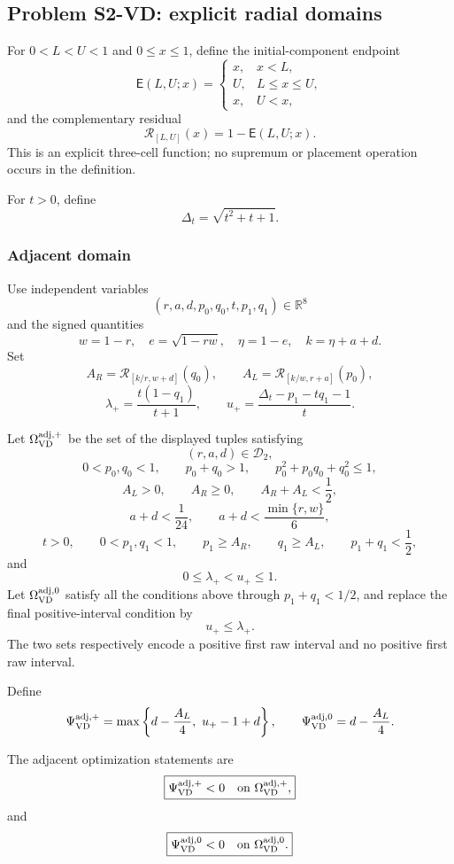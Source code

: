 \subsection{Problem S2-VD: explicit radial domains}

For \(0<L<U<1\) and \(0\le x\le1\), define the initial-component endpoint
\[
 \mathsf E(L,U;x)=
 \begin{cases}
 x,&x<L,\\
 U,&L\le x\le U,\\
 x,&U<x,
 \end{cases}
\]
and the complementary residual
\[
 \mathcal R_{[L,U]}(x)=1-\mathsf E(L,U;x).
\]
This is an explicit three-cell function; no supremum or placement operation
occurs in the definition.

For \(t>0\), define
\[
 \Delta_t=\sqrt{t^2+t+1}.
\]

\subsubsection{Adjacent domain}

Use independent variables
\[
 (r,a,d,p_0,q_0,t,p_1,q_1)\in\mathbb R^8
\]
and the signed quantities
\[
 w=1-r,\quad e=\sqrt{1-rw},\quad
 \eta=1-e,\quad k=\eta+a+d.
\]
Set
\[
 A_R=\mathcal R_{[k/r,w+d]}(q_0),
 \qquad
 A_L=\mathcal R_{[k/w,r+a]}(p_0),
\]
\[
 \lambda_+=\frac{t(1-q_1)}{t+1},
 \qquad
 u_+=\frac{\Delta_t-p_1-tq_1-1}{t}.
\]

\begin{definition}
\label{def:s2-vd-adjacent-domain}
Let \(\Omega_{\rm VD}^{\rm adj,+}\) be the set of the displayed tuples
satisfying
\[
 (r,a,d)\in\mathcal D_2,
\]
\[
 0<p_0,q_0<1,\qquad
 p_0+q_0>1,\qquad
 p_0^2+p_0q_0+q_0^2\le1,
\]
\[
 A_L>0,\qquad A_R\ge0,\qquad A_R+A_L<\frac12,
\]
\[
 a+d<\frac1{24},\qquad
 a+d<\frac{\min\{r,w\}}6,
\]
\[
 t>0,\qquad
 0<p_1,q_1<1,\qquad
 p_1\ge A_R,\qquad q_1\ge A_L,\qquad
 p_1+q_1<\frac12,
\]
and
\[
 0\le\lambda_+<u_+\le1.
\]
Let \(\Omega_{\rm VD}^{\rm adj,0}\) satisfy all the conditions above through
\(p_1+q_1<1/2\), and replace the final positive-interval condition by
\[
 u_+\le\lambda_+.
\]
The two sets respectively encode a positive first raw interval and no positive
first raw interval.
\end{definition}

Define
\[
 \Psi_{\rm VD}^{\rm adj,+}
 =\max\left\{d-\frac{A_L}{4},\ u_+-1+d\right\},
 \qquad
 \Psi_{\rm VD}^{\rm adj,0}
 =d-\frac{A_L}{4}.
\]

\begin{definition}
\label{prob:s2-vd-adjacent}
The adjacent optimization statements are
\[
 \boxed{
 \Psi_{\rm VD}^{\rm adj,+}<0
 \quad\text{on }\Omega_{\rm VD}^{\rm adj,+},
 }
\]
and
\[
 \boxed{
 \Psi_{\rm VD}^{\rm adj,0}<0
 \quad\text{on }\Omega_{\rm VD}^{\rm adj,0}.
 }
\]
\end{definition}

